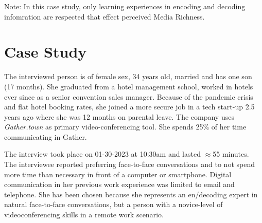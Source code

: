 \documentclass[man]{apa7}
\begin{document}
Note: In this case study, only learning experiences in encoding and decoding infomration are respected that effect perceived Media Richness.

\section{Case Study}

The interviewed person is of female sex, 34 years old, married and has one son (17 months). She graduated from a hotel management school, worked in hotels ever since as a senior convention sales manager. Because of the pandemic crisis and flat hotel booking rates, she joined a more secure job in a tech start-up 2.5 years ago where she was 12 months on parental leave. The company uses \textit{Gather.town} as primary video-conferencing tool. She spends 25\% of her time communicating in Gather.

The interview took place on 01-30-2023 at 10:30am and lasted $\approx$55 minutes. The interviewee reported preferring face-to-face conversations and to not spend more time than necessary in front of a computer or smartphone. Digital communication in her previous work experience was limited to email and telephone. She has been chosen because she represents an en/decoding expert in natural face-to-face conversations, but a person with a novice-level of videoconferencing skills in a remote work scenario. 
\end{document}
